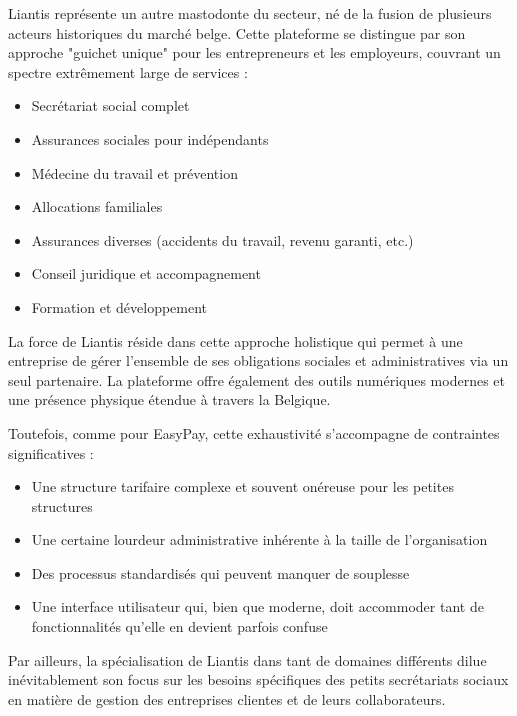 
Liantis représente un autre mastodonte du secteur, né de la fusion de plusieurs acteurs historiques du marché belge. Cette plateforme se distingue par son approche "guichet unique" pour les entrepreneurs et les employeurs, couvrant un spectre extrêmement large de services :

\begin{itemize}
  \item Secrétariat social complet
  \item Assurances sociales pour indépendants
  \item Médecine du travail et prévention
  \item Allocations familiales
  \item Assurances diverses (accidents du travail, revenu garanti, etc.)
  \item Conseil juridique et accompagnement
  \item Formation et développement
\end{itemize}

La force de Liantis réside dans cette approche holistique qui permet à une entreprise de gérer l'ensemble de ses obligations sociales et administratives via un seul partenaire. La plateforme offre également des outils numériques modernes et une présence physique étendue à travers la Belgique.

Toutefois, comme pour EasyPay, cette exhaustivité s'accompagne de contraintes significatives :
\begin{itemize}
  \item Une structure tarifaire complexe et souvent onéreuse pour les petites structures
  \item Une certaine lourdeur administrative inhérente à la taille de l'organisation
  \item Des processus standardisés qui peuvent manquer de souplesse
  \item Une interface utilisateur qui, bien que moderne, doit accommoder tant de fonctionnalités qu'elle en devient parfois confuse
\end{itemize}

Par ailleurs, la spécialisation de Liantis dans tant de domaines différents dilue inévitablement son focus sur les besoins spécifiques des petits secrétariats sociaux en matière de gestion des entreprises clientes et de leurs collaborateurs.

